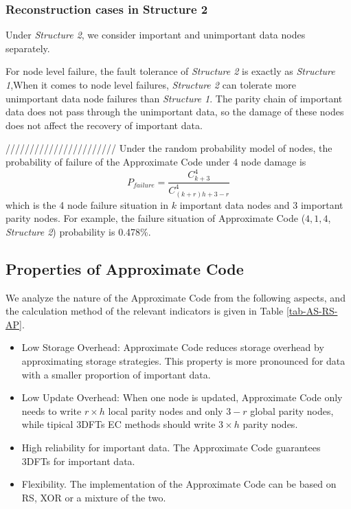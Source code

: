 \documentclass[sigconf]{acmart}
\begin{document}
\subsubsection{Reconstruction cases in Structure 2}
Under \emph{Structure 2}, we consider important and unimportant data nodes separately.

For node level failure, the fault tolerance of \emph{Structure 2} is exactly as \emph{Structure 1},When it comes to node level failures, \emph{Structure 2} can tolerate more unimportant data node failures than \emph{Structure 1}. The parity chain of important data does not pass through the unimportant data, so the damage of these nodes does not affect the recovery of important data.

///////////////////////
Under the random probability model of nodes, the probability of failure of the Approximate Code under 4 node damage is
\begin{equation}
    P_{failure} = \frac{C_{k+3}^4}{C_{(k+r)h+3-r}^4}
\end{equation}
which is the 4 node failure situation in $k$ important data nodes and 3 important parity nodes. For example, the failure situation of Approximate Code ($4,1,4$, \emph{Structure 2}) probability is 0.478\%.

\subsection{Properties of Approximate Code}\label{properties}

We analyze the nature of the Approximate Code from the following aspects, and the calculation method of the relevant indicators is given in Table \ref{tab-AS-RS-AP}.
\begin{itemize}
    \item Low Storage Overhead: Approximate Code reduces storage overhead by approximating storage strategies. This property is more pronounced for data with a smaller proportion of important data.
    \item Low Update Overhead: When one node is updated, Approximate Code only needs to write $r \times h$ local parity nodes and only $3-r$ global parity nodes, while tipical 3DFTs EC methods should write $3 \times h$ parity nodes.
    \item High reliability for important data. The Approximate Code guarantees 3DFTs for important data.
    \item Flexibility. The implementation of the Approximate Code can be based on RS, XOR or a mixture of the two.
\end{itemize}
\end{document}
